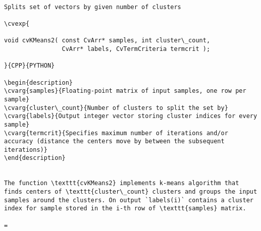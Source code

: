 \begin{verbatim}

Splits set of vectors by given number of clusters

\cvexp{

void cvKMeans2( const CvArr* samples, int cluster\_count,
                CvArr* labels, CvTermCriteria termcrit );

}{CPP}{PYTHON}

\begin{description}
\cvarg{samples}{Floating-point matrix of input samples, one row per sample}
\cvarg{cluster\_count}{Number of clusters to split the set by}
\cvarg{labels}{Output integer vector storing cluster indices for every sample}
\cvarg{termcrit}{Specifies maximum number of iterations and/or accuracy (distance the centers move by between the subsequent iterations)}
\end{description}


The function \texttt{cvKMeans2} implements k-means algorithm that finds centers of \texttt{cluster\_count} clusters and groups the input samples around the clusters. On output `labels(i)` contains a cluster index for sample stored in the i-th row of \texttt{samples} matrix.

=\end{verbatim}
